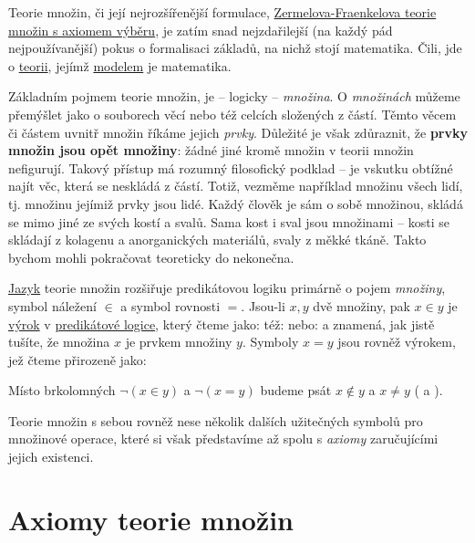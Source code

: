 Teorie množin, či její nejrozšířenější formulace,
\href{https://en.wikipedia.org/wiki/Zermelo%E2%80%93Fraenkel_set_theory}{Zermelova-Fraenkelova
teorie množin s axiomem výběru}, je zatím snad nejzdařilejší (na každý pád
nejpoužívanější) pokus o formalisaci základů, na nichž stojí matematika. Čili,
jde o \hyperref[def:teorie]{teorii}, jejímž \hyperref[def:model]{modelem} je
matematika.

Základním pojmem teorie množin, je -- logicky -- \emph{množina}. O
\emph{množinách} můžeme přemýšlet jako o souborech věcí nebo též celcích
složených z částí. Těmto věcem či částem uvnitř množin říkáme jejich
\emph{prvky}. Důležité je však zdůraznit, že \textbf{prvky množin jsou opět
množiny}: žádné jiné  kromě množin v teorii množin nefigurují. Takový
přístup má rozumný filosofický podklad -- je vskutku obtížné najít věc, která se
neskládá z částí. Totiž, vezměme například množinu všech lidí, tj. množinu
jejímiž prvky jsou lidé. Každý člověk je sám o sobě množinou, skládá se mimo
jiné ze svých kostí a svalů. Sama kost i sval jsou množinami -- kosti se
skládají z kolagenu a anorganických materiálů, svaly z měkké tkáně. Takto bychom
mohli pokračovat teoreticky do nekonečna.

\hyperref[def:jazyk]{Jazyk} teorie množin rozšiřuje predikátovou logiku primárně
o pojem \emph{množiny}, symbol náležení $ \in $ a symbol rovnosti $=$. Jsou-li
$x, y$ dvě množiny, pak $x \in y$ je \hyperref[def:vyrok]{výrok} v
\hyperref[def:predikatova-logika]{predikátové logice}, který čteme jako:  též:  nebo:  a znamená,
jak jistě tušíte, že množina $x$ je prvkem množiny $y$. Symboly $x = y$ jsou
rovněž výrokem, jež čteme přirozeně jako: 

\begin{notation}
  Místo brkolomných $\neg (x \in y)$ a $\neg (x = y)$ budeme psát $x \notin y$ a
  $x \neq y$ ( a ).
\end{notation}

Teorie množin s sebou rovněž nese několik dalších užitečných symbolů pro
množinové operace, které si však představíme až spolu s \emph{axiomy}
zaručujícími jejich existenci.

\section{Axiomy teorie množin}
\label{sec:axiomy-teorie-mnozin}

